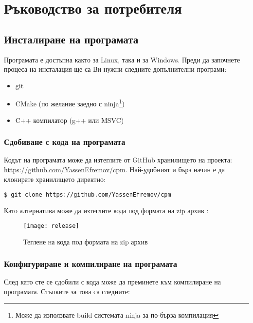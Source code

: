 \graphicspath{ {./chapter4/images/} }

\chapter{Ръководство за потребителя}


\section{Инсталиране на програмата}

Програмата е достъпна както за Linux, така и за Windows. Преди да започнете
процеса на инсталация ще са Ви нужни следните допълнителни програми:

\begin{itemize}
    \item git
    \item CMake (по желание заедно с ninja\footnote{Може да използвате build
          системата ninja за по-бърза компилация})
	\item C++ компилатор (g++ или MSVC)
\end{itemize}


\subsection{Сдобиване с кода на програмата}

Кодът на програмата може да изтеглите от GitHub хранилището на проекта:
\url{https://github.com/YassenEfremov/cpm}. Най-удобният и бърз начин е да
клонирате хранилището директно:

\begin{lstlisting}[style=shell]
$ git clone https://github.com/YassenEfremov/cpm
\end{lstlisting}

Като алтернатива може да изтеглите кода под формата на zip архив
:

\begin{figure}[h]
    \centering
    \texttt{[image: release]}
    \caption{Теглене на кода под формата на zip архив}
    \label{fig:download-zip}
\end{figure}


\subsection{Конфигуриране и компилиране на програмата}

След като сте се сдобили с кода може да преминете към компилиране на
програмата. Стъпките за това са следните:


